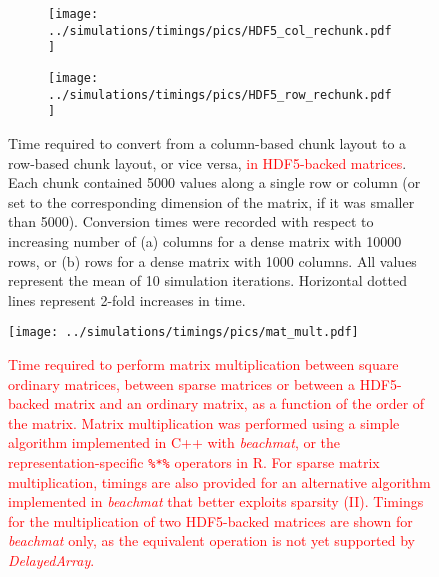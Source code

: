 \documentclass{article}
\newcommand{\beachmat}{\textit{beachmat}}
\newcommand{\code}[1]{\texttt{#1}}
\newcommand{\revised}[1]{\textcolor{red}{#1}}
\begin{document}
\begin{figure}[bt]
    \begin{subfigure}[bt]{0.49\textwidth}
        \texttt{[image: ../simulations/timings/pics/HDF5\_col\_rechunk.pdf]}
        \caption{}
    \end{subfigure}
    \begin{subfigure}[bt]{0.49\textwidth}
        \texttt{[image: ../simulations/timings/pics/HDF5\_row\_rechunk.pdf]}
        \caption{}
    \end{subfigure}
    \caption{Time required to convert from a column-based chunk layout to a row-based chunk layout, or vice versa, \revised{in HDF5-backed matrices}.
        Each chunk contained 5000 values along a single row or column (or set to the corresponding dimension of the matrix, if it was smaller than 5000).
        Conversion times were recorded with respect to increasing number of (a) columns for a dense matrix with 10000 rows, or (b) rows for a dense matrix with 1000 columns.
        All values represent the mean of 10 simulation iterations.
        Horizontal dotted lines represent 2-fold increases in time.
    }
    \label{fig:hdf5rechunk}
\end{figure}

\begin{figure}[bt]
    \begin{center}
        \texttt{[image: ../simulations/timings/pics/mat\_mult.pdf]}
    \end{center}
    \caption{\revised{Time required to perform matrix multiplication between square ordinary matrices, between sparse matrices or between a HDF5-backed matrix and an ordinary matrix,
as a function of the order of the matrix.     
Matrix multiplication was performed using a simple algorithm implemented in C++ with \beachmat{}, or the representation-specific \code{\%*\%} operators in R.
For sparse matrix multiplication, timings are also provided for an alternative algorithm implemented in \beachmat{} that better exploits sparsity (II). 
Timings for the multiplication of two HDF5-backed matrices are shown for \beachmat{} only, as the equivalent operation is not yet supported by \textit{DelayedArray}.}}
    \label{fig:matmult}
\end{figure}

\end{document}

